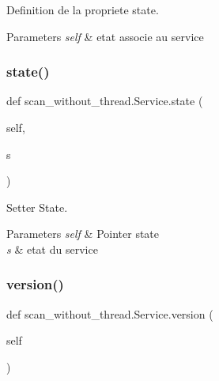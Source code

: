 Definition de la propriete state. 


\begin{DoxyParams}{Parameters}
{\em self} & etat associe au service \\
\hline
\end{DoxyParams}
\hypertarget{classscan__without__thread_1_1Service_aaebc50ca197d805732763f7af98ebedc}{}\label{classscan__without__thread_1_1Service_aaebc50ca197d805732763f7af98ebedc} 
\subsubsection{\texorpdfstring{state()}{state()}\hspace{0.1cm}{\footnotesize\ttfamily [2/2]}}
{\footnotesize\ttfamily def scan\+\_\+without\+\_\+thread.\+Service.\+state (\begin{DoxyParamCaption}\item[{}]{self,  }\item[{}]{s }\end{DoxyParamCaption})}



Setter State. 


\begin{DoxyParams}{Parameters}
{\em self} & Pointer state \\
\hline
{\em s} & etat du service \\
\hline
\end{DoxyParams}
\hypertarget{classscan__without__thread_1_1Service_a64d99ba899e83d37521657afdde0a470}{}\label{classscan__without__thread_1_1Service_a64d99ba899e83d37521657afdde0a470} 
\subsubsection{\texorpdfstring{version()}{version()}\hspace{0.1cm}{\footnotesize\ttfamily [1/2]}}
{\footnotesize\ttfamily def scan\+\_\+without\+\_\+thread.\+Service.\+version (\begin{DoxyParamCaption}\item[{}]{self }\end{DoxyParamCaption})}



